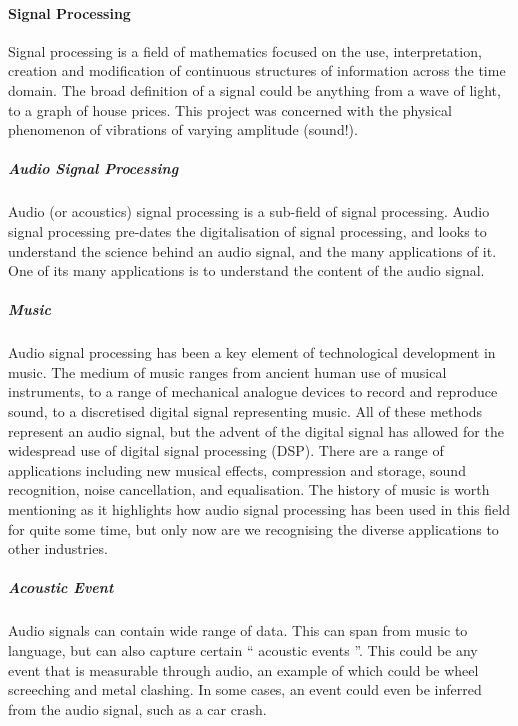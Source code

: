 \documentclass{UoNMCHA}
\newcommand{\inlineQuote}[1]{`` #1 ''}
\numberwithin{equation}{section}
\begin{document}
\paragraph{Signal Processing}
Signal processing is a field of mathematics focused on the use, interpretation, creation and modification of continuous structures of information across the time domain. The broad definition of a signal could be anything from a wave of light, to a graph of house prices. This project was concerned with the physical phenomenon of vibrations of varying amplitude (sound!).

\subparagraph{Audio Signal Processing}
Audio (or acoustics) signal processing is a sub-field of signal processing. Audio signal processing pre-dates the digitalisation of signal processing, and looks to understand the science behind an audio signal, and the many applications of it. One of its many applications is to understand the content of the audio signal.

\subparagraph{Music}
Audio signal processing has been a key element of technological development in music. The medium of music ranges from ancient human use of musical instruments, to a range of mechanical analogue devices to record and reproduce sound, to a discretised digital signal representing music. All of these methods represent an audio signal, but the advent of the digital signal has allowed for the widespread use of digital signal processing (DSP). There are a range of applications including new musical effects, compression and storage, sound recognition, noise cancellation, and equalisation. 
The history of music is worth mentioning as it highlights how audio signal processing has been used in this field for quite some time, but only now are we recognising the diverse applications to other industries.

\subparagraph{Acoustic Event}
Audio signals can contain wide range of data. This can span from music to language, but can also capture certain \inlineQuote{acoustic events}. This could be any event that is measurable through audio, an example of which could be wheel screeching and metal clashing. In some cases, an event could even be inferred from the audio signal, such as a car crash. %
\end{document}
